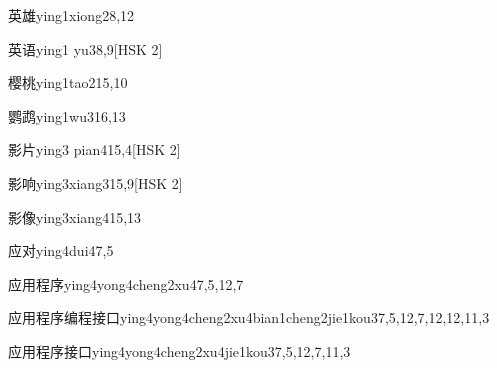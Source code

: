 \begin{entry}{英雄}{ying1xiong2}{8,12}
\end{entry}

\begin{entry}{英语}{ying1 yu3}{8,9}[HSK 2]
\end{entry}

\begin{entry}{樱桃}{ying1tao2}{15,10}
\end{entry}

\begin{entry}{鹦鹉}{ying1wu3}{16,13}
\end{entry}

\begin{entry}{影片}{ying3 pian4}{15,4}[HSK 2]
\end{entry}

\begin{entry}{影响}{ying3xiang3}{15,9}[HSK 2]
\end{entry}

\begin{entry}{影像}{ying3xiang4}{15,13}
\end{entry}

\begin{entry}{应对}{ying4dui4}{7,5}
\end{entry}

\begin{entry}{应用程序}{ying4yong4cheng2xu4}{7,5,12,7}
\end{entry}

\begin{entry}{应用程序编程接口}{ying4yong4cheng2xu4bian1cheng2jie1kou3}{7,5,12,7,12,12,11,3}
\end{entry}

\begin{entry}{应用程序接口}{ying4yong4cheng2xu4jie1kou3}{7,5,12,7,11,3}
\end{entry}

